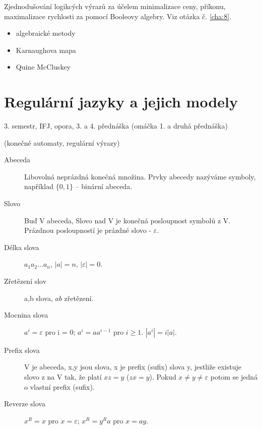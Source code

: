 \documentclass[a4wide]{report}
\begin{document}
Zjednodušování logikcých výrazů za účelem minimalizace ceny, příkonu, maximalizace rychlosti za pomocí Booleovy algebry. Viz otázka č. \ref{cha:8}.
\begin{itemize}
	\item algebraické metody
	\item Karnaughova mapa
	\item Quine McCluskey
\end{itemize}






















\chapter{Regulární jazyky a jejich modely} \label{cha:20}

3. semestr, IFJ, opora, 3. a 4. přednáška (omáčka 1. a druhá přednáška)

(konečné automaty, regulární výrazy)

\begin{description}
	\item[Abeceda] Libovolná neprázdná konečná množina. Prvky abecedy nazýváme symboly, například $\{0, 1\}$ -- binární abeceda.
	\item[Slovo] Buď V abeceda, Slovo nad V je konečná posloupnost symbolů z V. Prázdnou posloupností je prázdné slovo - $\varepsilon$.
	\item[Délka slova] $a_1 a_2 \dots a_n$, $|a| = n$, $|\varepsilon| = 0$.
	\item[Zřetězení slov] a,b slova, $ab$ zřetězení.
	\item[Mocnina slova] $a^i = \varepsilon$ pro i = 0; $a^i = a a^{i-1}$ pro $i \geq 1$. $|a^i| = i |a|$.
	\item[Prefix slova] V je abeceda, x,y jsou slova, x je prefix (sufix) slova y, jestliže existuje slovo z na V tak, že platí $xz = y$ ($zx = y$). Pokud $x \neq y \neq \varepsilon$ potom se jedná o vlastní prefix (sufix).
	\item[Reverze slova] $x^R = x$ pro $x = \varepsilon$; $x^R = y^Ra$ pro $x = ay$.
\end{description}
\end{document}
